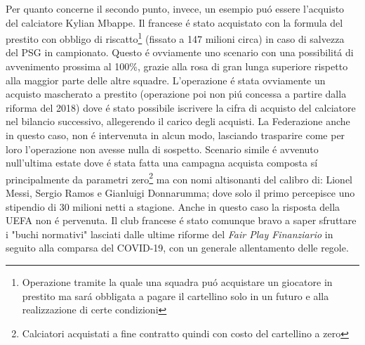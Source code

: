 \documentclass[
    corpo=12pt,
    oneside,
    evenboxes,
    tipotesi=triennale,
    stile=classica,
    oldstyle,
    autoretitolo,
    greek,
]{toptesi}
\begin{document}
\begin{interlinea}{1.5}
Per quanto concerne il secondo punto, invece, un esempio pu\'o essere l'acquisto del calciatore Kylian Mbappe. Il francese \'e stato acquistato 
con la formula del prestito con obbligo di riscatto\footnote{Operazione tramite la quale una squadra pu\'o acquistare un giocatore in prestito ma sar\'a obbligata a pagare il cartellino solo in un futuro e alla realizzazione di certe condizioni} 
(fissato a 147 milioni circa) in caso di salvezza del PSG in campionato.
Questo \'e ovviamente uno scenario con una possibilit\'a di avvenimento prossima al 100\%, grazie alla rosa di gran lunga superiore rispetto alla maggior parte delle altre squadre.
L'operazione \'e stata ovviamente un acquisto mascherato a prestito (operazione poi non pi\'u concessa a partire dalla riforma del 2018) dove
\'e stato possibile iscrivere la cifra di acquisto del calciatore nel bilancio successivo, allegerendo il carico degli acquisti. La Federazione 
anche in questo caso, non \'e intervenuta in alcun modo, lasciando trasparire come per loro l'operazione non avesse nulla di sospetto. 
Scenario simile \'e avvenuto null'ultima estate dove \'e stata fatta una campagna acquista composta s\'i principalmente da parametri zero\footnote{Calciatori acquistati a fine contratto quindi con costo del cartellino a zero}
ma con nomi altisonanti del calibro di: Lionel Messi, Sergio Ramos e Gianluigi Donnarumma; dove solo il primo percepisce uno stipendio di 30 milioni
netti a stagione. Anche in questo caso la risposta della UEFA non \'e pervenuta. Il club francese \'e stato comunque bravo a saper sfruttare
i "buchi normativi" lasciati dalle ultime riforme del \emph{Fair Play Finanziario} in seguito alla comparsa del COVID-19, con un generale
allentamento delle regole.

\end{interlinea}
\end{document}
